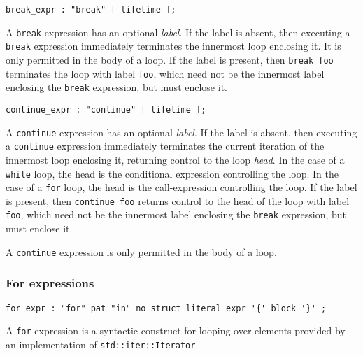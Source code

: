 \documentclass[]{article}
\begin{document}
\begin{verbatim}
break_expr : "break" [ lifetime ];
\end{verbatim}

A \texttt{break} expression has an optional \emph{label}. If the label
is absent, then executing a \texttt{break} expression immediately
terminates the innermost loop enclosing it. It is only permitted in the
body of a loop. If the label is present, then \texttt{break foo}
terminates the loop with label \texttt{foo}, which need not be the
innermost label enclosing the \texttt{break} expression, but must
enclose it.


\begin{verbatim}
continue_expr : "continue" [ lifetime ];
\end{verbatim}

A \texttt{continue} expression has an optional \emph{label}. If the
label is absent, then executing a \texttt{continue} expression
immediately terminates the current iteration of the innermost loop
enclosing it, returning control to the loop \emph{head}. In the case of
a \texttt{while} loop, the head is the conditional expression
controlling the loop. In the case of a \texttt{for} loop, the head is
the call-expression controlling the loop. If the label is present, then
\texttt{continue foo} returns control to the head of the loop with label
\texttt{foo}, which need not be the innermost label enclosing the
\texttt{break} expression, but must enclose it.

A \texttt{continue} expression is only permitted in the body of a loop.

\subsubsection{For expressions}\label{for-expressions}

\begin{verbatim}
for_expr : "for" pat "in" no_struct_literal_expr '{' block '}' ;
\end{verbatim}

A \texttt{for} expression is a syntactic construct for looping over
elements provided by an implementation of \texttt{std::iter::Iterator}.
\end{document}
